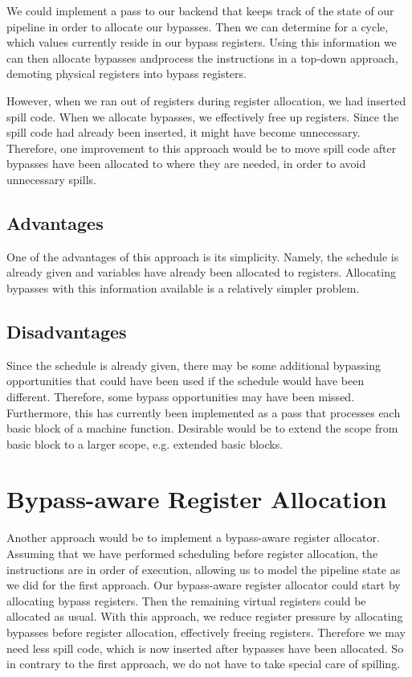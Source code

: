 We could implement a pass to our backend that keeps track of the state of our pipeline in order to allocate our bypasses. Then we can determine for a cycle, which values currently reside in our bypass registers. Using this information we can then allocate bypasses andprocess the instructions in a top-down approach, demoting physical registers into bypass registers.

However, when we ran out of registers during register allocation, we had inserted spill code. When we allocate bypasses, we effectively free up registers. Since the spill code had already been inserted, it might have become unnecessary. Therefore, one improvement to this approach would be to move spill code after bypasses have been allocated to where they are needed, in order to avoid unnecessary spills.

\subsection{Advantages}
One of the advantages of this approach is its simplicity. Namely, the schedule is already given and variables have already been allocated to registers. Allocating bypasses with this information available is a relatively simpler problem. 

\subsection{Disadvantages}
Since the schedule is already given, there may be some additional bypassing opportunities that could have been used if the schedule would have been different. Therefore, some bypass opportunities may have been missed. Furthermore, this has currently been implemented as a pass that processes each basic block of a machine function. Desirable would be to extend the scope from basic block to a larger scope, e.g. extended basic blocks. 

\section{Bypass-aware Register Allocation}\label{sec:ra_approach}
Another approach would be to implement a bypass-aware register allocator. Assuming that we have performed scheduling before register allocation, the instructions are in order of execution, allowing us to model the pipeline state as we did for the first approach. Our bypass-aware register allocator could start by allocating bypass registers. Then the remaining virtual registers could be allocated as usual. With this approach, we reduce register pressure by allocating bypasses before register allocation, effectively freeing registers. Therefore we may need less spill code, which is now inserted after bypasses have been allocated. So in contrary to the first approach, we do not have to take special care of spilling.

